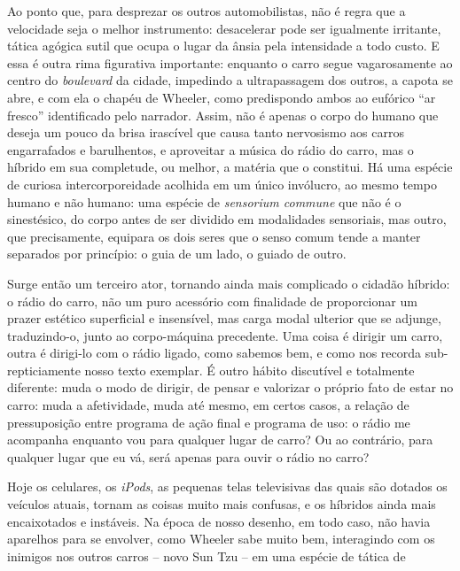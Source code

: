 \begin{multicols}{2}
\par{}Ao ponto que,\allowbreak{} para desprezar os outros automobilistas,\allowbreak{} não é regra que a velocidade seja o melhor instrumento:\allowbreak{} desacelerar pode ser igualmente irritante,\allowbreak{} tática agógica sutil que ocupa o lugar da ânsia pela intensidade a todo custo.\allowbreak{} E essa é outra rima figurativa importante:\allowbreak{} enquanto o carro segue vagarosamente ao centro do \textit{boulevard} da cidade,\allowbreak{} impedindo a ultrapassagem dos outros,\allowbreak{} a capota se abre,\allowbreak{} e com ela o chapéu de Wheeler,\allowbreak{} como predispondo ambos ao eufórico “ar fresco” identificado pelo narrador.\allowbreak{} Assim,\allowbreak{} não é apenas o corpo do humano que deseja um pouco da brisa irascível que causa tanto nervosismo aos carros engarrafados e barulhentos,\allowbreak{} e aproveitar a música do rádio do carro,\allowbreak{} mas o híbrido em sua completude,\allowbreak{} ou melhor,\allowbreak{} a matéria que o constitui.\allowbreak{} Há uma espécie de curiosa intercorporeidade acolhida em um único invólucro,\allowbreak{} ao mesmo tempo humano e não humano:\allowbreak{} uma espécie de \textit{sensorium commune} que não é o sinestésico,\allowbreak{} do corpo antes de ser dividido em modalidades sensoriais,\allowbreak{} mas outro,\allowbreak{} que precisamente,\allowbreak{} equipara os dois seres que o senso comum tende a manter separados por princípio:\allowbreak{} o guia de um lado,\allowbreak{} o guiado de outro.\allowbreak{}\par{}Surge então um terceiro ator,\allowbreak{} tornando ainda mais complicado o cidadão híbrido:\allowbreak{} o rádio do carro,\allowbreak{} não um puro acessório com finalidade de proporcionar um prazer estético superficial e insensível,\allowbreak{} mas carga modal ulterior que se adjunge,\allowbreak{} traduzindo-\allowbreak{}o,\allowbreak{} junto ao corpo-\allowbreak{}máquina precedente.\allowbreak{} Uma coisa é dirigir um carro,\allowbreak{} outra é dirigi-\allowbreak{}lo com o rádio ligado,\allowbreak{} como sabemos bem,\allowbreak{} e como nos recorda sub-\allowbreak{}repticiamente nosso texto exemplar.\allowbreak{} É outro hábito discutível e totalmente diferente:\allowbreak{} muda o modo de dirigir,\allowbreak{} de pensar e valorizar o próprio fato de estar no carro:\allowbreak{} muda a afetividade,\allowbreak{} muda até mesmo,\allowbreak{} em certos casos,\allowbreak{} a relação de pressuposição entre programa de ação final e programa de uso:\allowbreak{} o rádio me acompanha enquanto vou para qualquer lugar de carro? Ou ao contrário,\allowbreak{} para qualquer lugar que eu vá,\allowbreak{} será apenas para ouvir o rádio no carro?\par{}Hoje os celulares,\allowbreak{} os \textit{iPods},\allowbreak{} as pequenas telas televisivas das quais são dotados os veículos atuais,\allowbreak{} tornam as coisas muito mais confusas,\allowbreak{} e os híbridos ainda mais encaixotados e instáveis.\allowbreak{} Na época de nosso desenho,\allowbreak{} em todo caso,\allowbreak{} não havia aparelhos para se envolver,\allowbreak{} como Wheeler sabe muito bem,\allowbreak{} interagindo com os inimigos nos outros carros – novo Sun Tzu – em uma espécie de tática de 
\end{multicols}
